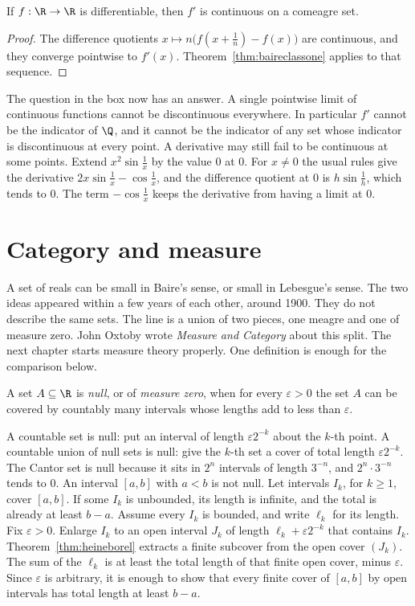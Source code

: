 \begin{corollary}\label{cor:derivative}
If $f:\R\to\R$ is differentiable, then $f'$ is continuous on a comeagre set.
\end{corollary}
\begin{proof}
The difference quotients $x\mapsto n\bigl(f(x+\frac1n)-f(x)\bigr)$ are continuous, and they converge pointwise to $f'(x)$. Theorem~\ref{thm:baireclassone} applies to that sequence.
\end{proof}

The question in the box now has an answer. A single pointwise limit of continuous functions cannot be discontinuous everywhere. In particular $f'$ cannot be the indicator of $\Q$, and it cannot be the indicator of any set whose indicator is discontinuous at every point. A derivative may still fail to be continuous at some points. Extend $x^2\sin\frac1x$ by the value $0$ at $0$. For $x\ne0$ the usual rules give the derivative $2x\sin\frac1x-\cos\frac1x$, and the difference quotient at $0$ is $h\sin\frac1h$, which tends to $0$. The term $-\cos\frac1x$ keeps the derivative from having a limit at $0$.

\section{Category and measure}\label{sec:categorymeasure}

A set of reals can be small in Baire's sense, or small in Lebesgue's sense. The two ideas appeared within a few years of each other, around 1900. They do not describe the same sets. The line is a union of two pieces, one meagre and one of measure zero. John Oxtoby wrote \emph{Measure and Category} about this split. The next chapter starts measure theory properly. One definition is enough for the comparison below.

\begin{definition}
A set $A\subseteq\R$ is \emph{null}, or of \emph{measure zero}, when for every $\varepsilon>0$ the set $A$ can be covered by countably many intervals whose lengths add to less than $\varepsilon$.
\end{definition}

A countable set is null: put an interval of length $\varepsilon2^{-k}$ about the $k$-th point. A countable union of null sets is null: give the $k$-th set a cover of total length $\varepsilon2^{-k}$. The Cantor set is null because it sits in $2^n$ intervals of length $3^{-n}$, and $2^n\cdot3^{-n}$ tends to $0$. An interval $[a,b]$ with $a<b$ is not null. Let intervals $I_k$, for $k\ge1$, cover $[a,b]$. If some $I_k$ is unbounded, its length is infinite, and the total is already at least $b-a$. Assume every $I_k$ is bounded, and write $\ell_k$ for its length. Fix $\varepsilon>0$. Enlarge $I_k$ to an open interval $J_k$ of length $\ell_k+\varepsilon2^{-k}$ that contains $I_k$. Theorem~\ref{thm:heineborel} extracts a finite subcover from the open cover $(J_k)$. The sum of the $\ell_k$ is at least the total length of that finite open cover, minus $\varepsilon$. Since $\varepsilon$ is arbitrary, it is enough to show that every finite cover of $[a,b]$ by open intervals has total length at least $b-a$.


